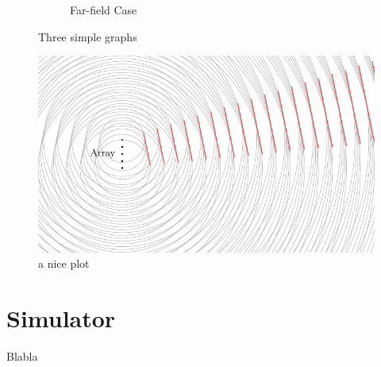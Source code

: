 \begin{figure}
\begin{subfigure}[b]{0.45\textwidth}
    \caption{Far-field Case}
    \label{fig:three sin x}
  \end{subfigure}
  \caption{Three simple graphs}
  \label{fig:three graphs}
\end{figure}



\begin{figure}
  \centering
  \includegraphics[]{beamforming_1.pdf}
  \caption{a nice plot}
  \label{fig:mesh1}
\end{figure}

\newpage
\section{Simulator}
Blabla
